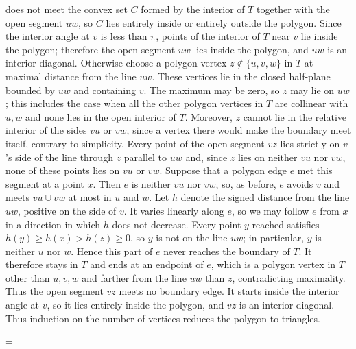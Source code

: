 \documentclass[11pt]{article}
\makeatletter
\theoremstyle{ntstyle}
\let\nt@closedisplay\]
\def\nt@guardedclose{\@ifnextchar\par{\nt@closeafterpar}{\@ifnextchar\end{\postdisplaypenalty\@M\nt@closedisplay}{\nt@closedisplay}}}
\def\nt@closeafterpar\par{\@ifnextchar\par{\nt@closeafterpar}{\@ifnextchar\end{\postdisplaypenalty\@M\nt@closedisplay\par}{\nt@closedisplay\par}}}
\renewenvironment{proof}[1][\proofname]{\par
  \pushQED{\qed}\normalfont\topsep\medskipamount\edef\nt@afterproof{\@endparpenalty=\the\@endparpenalty\relax}\@beginparpenalty\@M\@endparpenalty\@M\let\]\nt@guardedclose\trivlist\item[]\textit{#1\@addpunct{.}} \ignorespaces}{\ifvmode\addpenalty\@M\fi\popQED\nt@afterproof\endtrivlist\@endpefalse}
\makeatother
\begin{document}
\begin{proof}
	does not meet the convex set $C$ formed by the interior of $T$ together
	with the open segment $uw$, so $C$ lies entirely inside or entirely
	outside the polygon. Since the interior angle at $v$ is less than
	$\pi$, points of the interior of $T$ near $v$ lie inside the
	polygon; therefore the open segment $uw$ lies inside the polygon, and $uw$
	is an interior diagonal. Otherwise choose a polygon vertex
	$z\notin\{u,v,w\}$ in $T$ at maximal distance from the line $uw$. These
	vertices lie in the closed half-plane bounded by $uw$ and containing $v$.
	The maximum may be zero, so $z$ may lie on $uw$; this includes the case
	when all the other polygon vertices in $T$ are collinear with $u,w$ and
	none lies in the open interior of $T$. Moreover, $z$ cannot lie in the
	relative interior of the sides $vu$ or $vw$, since a vertex there would
	make the boundary meet itself, contrary to simplicity. Every point of
	the open segment $vz$ lies strictly on $v$'s side of the line through $z$
	parallel to $uw$ and, since $z$ lies on neither $vu$ nor $vw$, none of
	these points lies on $vu$ or $vw$. Suppose that a polygon edge $e$ met
	this segment at a point $x$. Then $e$ is neither $vu$ nor $vw$, so, as
	before, $e$ avoids $v$ and meets $vu\cup vw$ at most in $u$ and $w$.
	Let $h$ denote the signed distance from the line $uw$, positive on the
	side of $v$. It varies linearly along $e$, so we may follow $e$ from $x$
	in a direction in which $h$ does not decrease. Every point $y$ reached
	satisfies $h(y)\ge h(x)>h(z)\ge0$, so $y$ is not on the line $uw$; in
	particular, $y$ is neither $u$ nor $w$. Hence this part of $e$ never
	reaches the boundary of $T$. It therefore stays in $T$ and ends at an
	endpoint of $e$, which is a polygon vertex in $T$ other than $u,v,w$ and
	farther from the line $uw$ than $z$, contradicting maximality. Thus the open segment $vz$ meets no
	boundary edge. It starts
	inside the interior angle at $v$, so it lies entirely inside the polygon,
	and $vz$ is an interior diagonal. Thus induction on the number of
	vertices reduces the polygon to triangles.


\end{proof}
\end{document}
